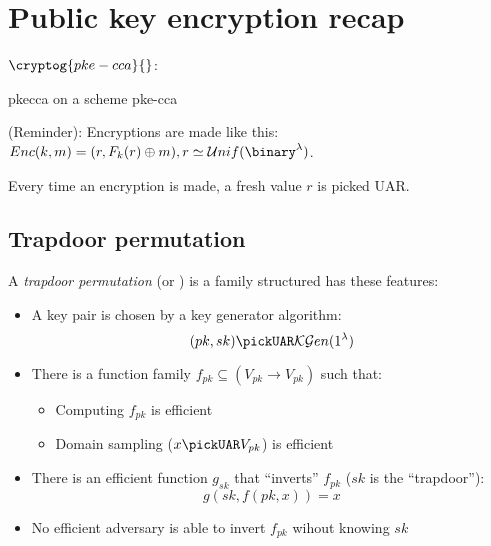 \section{Public key encryption recap} 

$\cryptog{pke-cca}{}$:

\begin{cryptogame}
    {pkecca}
    {\cca{} on a \pke{} scheme}
    {pke-cca}
    

    \cseqdelay
    \cseqbeginloop


    \cseqendloop
    \cseqdelay



    \cseqdelay
    \cseqbeginloop


    \cseqendloop
    \cseqdelay

\end{cryptogame}


(Reminder): Encryptions are made like this: $Enc(k, m) = (r, F_k(r) \oplus m), r \simeq \mathcal{U}nif(\binary^\lambda)$.

Every time an encryption is made, a fresh value $r$ is picked UAR.

\pagebreak
\subsection{Trapdoor permutation}

A \emph{trapdoor permutation} (or \tdp) is a \owp{} family structured has these features:

\begin{itemize}
    \item A key pair is chosen \uar{} by a key generator algorithm:
    \[
        (pk, sk) \pickUAR \mathcal{KG}en(1^\lambda)
    \]
    \item There is a function family $f_{pk} \subseteq (V_{pk} \to V_{pk})$ such that:
    \begin{itemize}
        \item Computing $f_{pk}$ is efficient
        \item Domain sampling ($x \pickUAR V_{pk}$) is efficient
    \end{itemize}
    \item There is an efficient function $g_{sk}$ that ``inverts'' $f_{pk}$ ($sk$ is the ``trapdoor''): 
    \begin{equation*}
        g(sk, f(pk, x)) = x
    \end{equation*}
    \item No efficient adversary is able to invert $f_{pk}$ wihout knowing $sk$
\end{itemize}

